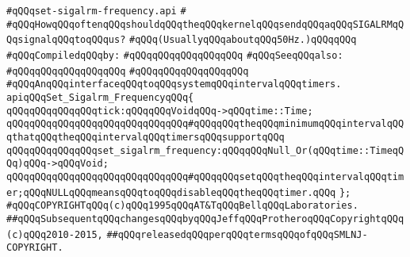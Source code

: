 \label{src/lib/std/src/nj/set-sigalrm-frequency.api}
\verb|#qQQqset-sigalrm-frequency.api|\newline
\verb|#|\newline
\verb|#qQQqHowqQQqoftenqQQqshouldqQQqtheqQQqkernelqQQqsendqQQqaqQQqSIGALRMqQQqsignalqQQqtoqQQqus?|\newline
\verb|#qQQq(UsuallyqQQqaboutqQQq50Hz.)qQQqqQQq|\newline
\newline
\verb|#qQQqCompiledqQQqby:|\newline
\verb|#qQQqqQQqqQQqqQQqqQQq|\newline
\newline
\verb|#qQQqSeeqQQqalso:|\newline
\verb|#qQQqqQQqqQQqqQQqqQQq|\newline
\verb|#qQQqqQQqqQQqqQQqqQQq|\newline
\newline
\newline
\verb|#qQQqAnqQQqinterfaceqQQqtoqQQqsystemqQQqintervalqQQqtimers.|\newline
\newline
\newline
\verb|apiqQQqSet_Sigalrm_FrequencyqQQq{|\newline
\newline
\verb|qQQqqQQqqQQqqQQqtick:qQQqqQQqVoidqQQq->qQQqtime::Time;|\newline
\verb|qQQqqQQqqQQqqQQqqQQqqQQqqQQqqQQq#qQQqqQQqtheqQQqminimumqQQqintervalqQQqthatqQQqtheqQQqintervalqQQqtimersqQQqsupportqQQq|\newline
\newline
\verb|qQQqqQQqqQQqqQQqset_sigalrm_frequency:qQQqqQQqNull_Or(qQQqtime::TimeqQQq)qQQq->qQQqVoid;|\newline
\verb|qQQqqQQqqQQqqQQqqQQqqQQqqQQqqQQq#qQQqqQQqsetqQQqtheqQQqintervalqQQqtimer;qQQqNULLqQQqmeansqQQqtoqQQqdisableqQQqtheqQQqtimer.qQQq|\newline
\newline
\verb|};|\newline
\newline
\newline
\newline
\verb|#qQQqCOPYRIGHTqQQq(c)qQQq1995qQQqAT&TqQQqBellqQQqLaboratories.|\newline
\verb|##qQQqSubsequentqQQqchangesqQQqbyqQQqJeffqQQqProtheroqQQqCopyrightqQQq(c)qQQq2010-2015,|\newline
\verb|##qQQqreleasedqQQqperqQQqtermsqQQqofqQQqSMLNJ-COPYRIGHT.|\newline

